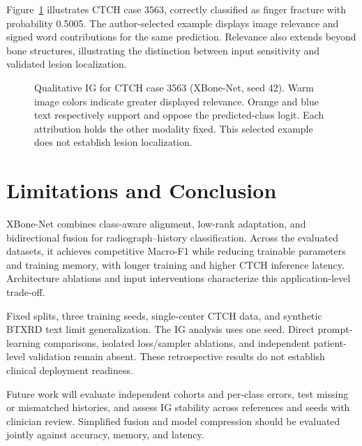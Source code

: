 \documentclass[conference,a4paper]{IEEEtran}
\begin{document}
Figure~\ref{fig:ig_case} illustrates CTCH case 3563, correctly classified as finger fracture with probability 0.5005. The author-selected example displays image relevance and signed word contributions for the same prediction. Relevance also extends beyond bone structures, illustrating the distinction between input sensitivity and validated lesion localization.

\begin{figure}[t]
\centering

\caption{Qualitative IG for CTCH case 3563 (XBone-Net, seed 42). Warm image colors indicate greater displayed relevance. Orange and blue text respectively support and oppose the predicted-class logit. Each attribution holds the other modality fixed. This selected example does not establish lesion localization.}
\label{fig:ig_case}
\end{figure}

\section{Limitations and Conclusion}
XBone-Net combines class-aware alignment, low-rank adaptation, and bidirectional fusion for radiograph--history classification. Across the evaluated datasets, it achieves competitive Macro-F1 while reducing trainable parameters and training memory, with longer training and higher CTCH inference latency. Architecture ablations and input interventions characterize this application-level trade-off.

Fixed splits, three training seeds, single-center CTCH data, and synthetic BTXRD text limit generalization. The IG analysis uses one seed. Direct prompt-learning comparisons, isolated loss/sampler ablations, and independent patient-level validation remain absent. These retrospective results do not establish clinical deployment readiness.

Future work will evaluate independent cohorts and per-class errors, test missing or mismatched histories, and assess IG stability across references and seeds with clinician review. Simplified fusion and model compression should be evaluated jointly against accuracy, memory, and latency.



\end{document}
